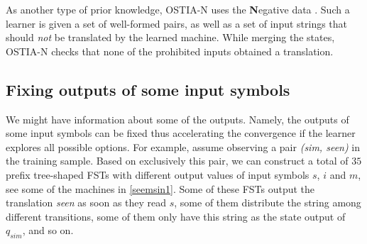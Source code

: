 As another type of prior knowledge, OSTIA-N uses the \textbf{N}egative data \citep{OncinaVaro1996}.
Such a learner is given a set of well-formed pairs, as well as a set of input strings that should \emph{not} be translated by the learned machine.
While merging the states, OSTIA-N checks that none of the prohibited inputs obtained a translation.


\subsection{Fixing outputs of some input symbols}

We might have information about some of the outputs.
Namely, the outputs of some input symbols can be fixed thus accelerating the convergence if the learner explores all possible options.
For example, assume observing a pair \emph{(sim, seen)} in the training sample.
Based on exclusively this pair, we can construct a total of $35$ prefix tree-shaped FSTs with different output values of input symbols $s$, $i$ and $m$, see some of the machines in \ref{seemsin1}.
Some of these FSTs output the translation \emph{seen} as soon as they read $s$, some of them distribute the string among different transitions, some of them only have this string as the state output of $q_{sim}$, and so on.


